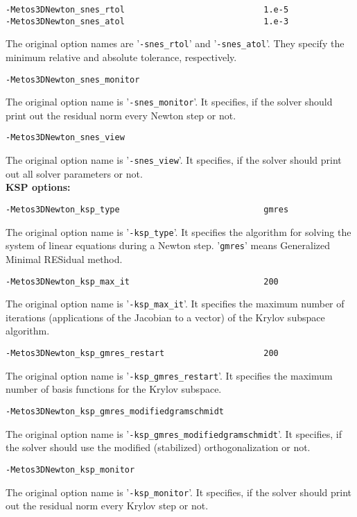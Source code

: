 \documentclass{article}
\begin{document}
\begin{verbatim}
-Metos3DNewton_snes_rtol                            1.e-5
-Metos3DNewton_snes_atol                            1.e-3
\end{verbatim}
The original option names are '\texttt{-snes\_rtol}' and '\texttt{-snes\_atol}'.
They specify the minimum relative and absolute tolerance,
respectively.

\begin{verbatim}
-Metos3DNewton_snes_monitor
\end{verbatim}
The original option name is '\texttt{-snes\_monitor}'. It specifies,
if the solver should print out the residual norm every Newton step or not.

\begin{verbatim}
-Metos3DNewton_snes_view
\end{verbatim}
The original option name is '\texttt{-snes\_view}'. It specifies,
if the solver should print out all solver parameters or not. \\

\textbf{KSP options:}

\begin{verbatim}
-Metos3DNewton_ksp_type                             gmres
\end{verbatim}
The original option name is '\texttt{-ksp\_type}'. It specifies the
algorithm for solving the system of linear equations during a
Newton step. '\texttt{gmres}' means Generalized Minimal RESidual method.

\begin{verbatim}
-Metos3DNewton_ksp_max_it                           200
\end{verbatim}
The original option name is '\texttt{-ksp\_max\_it}'. 
It specifies the maximum number of iterations (applications of the
Jacobian to a vector) of the Krylov subspace algorithm.

\begin{verbatim}
-Metos3DNewton_ksp_gmres_restart                    200
\end{verbatim}
The original option name is '\texttt{-ksp\_gmres\_restart}'.
It specifies the maximum number of basis functions for the Krylov subspace.

\begin{verbatim}
-Metos3DNewton_ksp_gmres_modifiedgramschmidt
\end{verbatim}
The original option name is '\texttt{-ksp\_gmres\_modifiedgramschmidt}'.
It specifies, if the solver should use the modified (stabilized) orthogonalization or not.

\begin{verbatim}
-Metos3DNewton_ksp_monitor
\end{verbatim}
The original option name is '\texttt{-ksp\_monitor}'.
It specifies,
if the solver should print out the residual norm every Krylov step or not.

%
%

%

\end{document}
